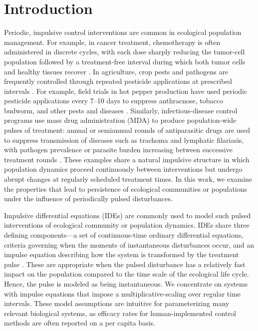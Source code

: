 \documentclass{article}
\theoremstyle{definition}
\begin{document}
\section{Introduction}
Periodic, impulsive control interventions are common in ecological population management. For example, in cancer treatment,  chemotherapy is often administered in discrete cycles, with each dose sharply reducing the tumor-cell population followed by a treatment-free interval during which both tumor cells and healthy tissues recover \cite{lakmeche_chemo_periodic_2000, ren2017tumour, diovidio_pulsed_cell_pop_2024}. In agriculture, crop pests and pathogens are frequently controlled through repeated pesticide applications at prescribed intervals \cite{mailleret_pulsed_biocontrol_2009, tang_periodic_lv_2002, mermer2021timing}.  For example, field trials in hot pepper production have used periodic pesticide applications every 7–10 days to suppress anthracnose, tobacco budworm, and other pests and diseases \cite{kim2013three}. Similarly, infectious-disease control programs use mass drug administration (MDA) to produce population-wide pulses of treatment: annual or semiannual rounds of antiparasitic drugs are used to suppress transmission of diseases such as trachoma and lymphatic filariasis, with pathogen prevalence or parasite burden increasing between successive treatment rounds \cite{gao2017mass, WHO2006preventive, patel_spectral_2024, patel2025anthelmintic}. These examples share a natural impulsive structure in which population dynamics proceed continuously between interventions but undergo abrupt changes at regularly scheduled treatment times.
In this work, we examine the properties that lead to persistence of ecological communities or populations under the influence of periodically pulsed disturbances. 


Impulsive differential equations (IDEs) are commonly used to model such pulsed interventions of ecological community or population dynamics.  IDEs share three defining components—a set of continuous-time ordinary differential equations, criteria governing when the moments of instantaneous disturbances occur, and an impulse equation describing how the system is transformed by the treatment pulse \cite{stamova_overview_ides_2016}. These are appropriate when the pulsed disturbance has a relatively fast impact on the population compared to the time scale of the ecological life cycle. Hence, the pulse is modeled as being instantaneous. We concentrate on systems with impulse equations that impose a multiplicative-scaling over regular time intervals. These model assumptions are intuitive for parameterizing many relevant biological systems, as efficacy rates for human-implemented control methods are often reported on a per capita basis.  
\end{document}
